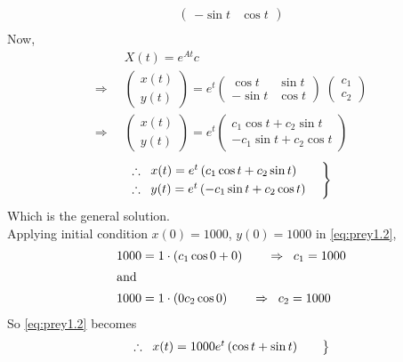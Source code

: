 \documentclass[../main-sheet.tex]{subfiles}
\begin{document}
\begin{soln}
\begin{align*}
\begin{pmatrix}
            -\sin t & \cos t
        \end{pmatrix}\\
    \end{align*}
    Now,
    \begin{align*}
        &X(t)=e^{At}c\\
        \Rightarrow\;\;&\begin{pmatrix}
            x(t)\\
            y(t)
        \end{pmatrix}=e^t\begin{pmatrix}
            \cos t & \sin t\\
            -\sin t & \cos t
        \end{pmatrix}\;\begin{pmatrix}
            c_1\\
            c_2
        \end{pmatrix}\\
        \Rightarrow\;\;&\begin{pmatrix}
            x(t)\\
            y(t)
        \end{pmatrix}=e^t\begin{pmatrix}
            c_1\cos t +c_2\sin t\\
            -c_1\sin t +c_2\cos t
        \end{pmatrix}
    \end{align*}
    \begin{equation}
        \begin{rcases}
            \therefore\;\;x(t)=e^t\left( c_1\cos t +c_2\sin t \right)\qquad \\
            \therefore\;\;y(t)=e^t\left( -c_1\sin t +c_2\cos t \right)
        \end{rcases}
        \label{eq:prey1.2}
    \end{equation}
    Which is the general solution.\\
    Applying initial condition \(x(0)=1000\), \(y(0)=1000\) in \eqref{eq:prey1.2},
    \begin{align*}
        &1000=1\cdot (c_1\cos 0+0)\qquad\Rightarrow\;\;c_1=1000\\
        \intertext{and}
        &1000=1\cdot (0c_2\cos 0)\qquad\Rightarrow\;\;c_2=1000
    \end{align*}
    So \eqref{eq:prey1.2} becomes
    \begin{equation}
        \begin{rcases}
            \therefore\;\;x(t)=1000e^t\left(\cos t +\sin t \right)\qquad \\

\end{rcases}
\end{equation}
\end{soln}
\end{document}
